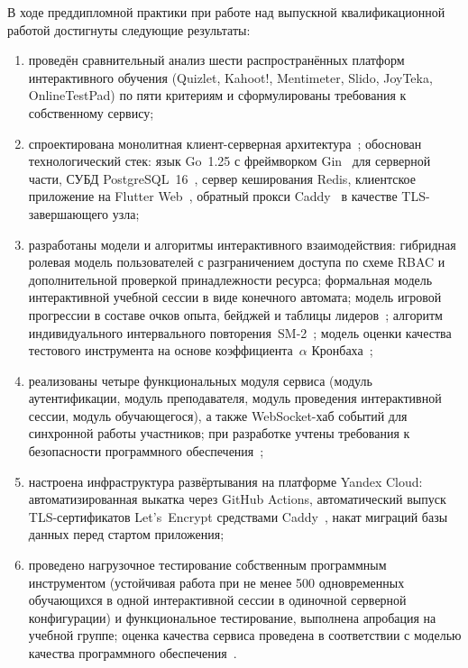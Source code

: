 \documentclass[14pt, a4paper]{extarticle}
\begin{document}
В ходе преддипломной практики при работе над выпускной квалификационной работой достигнуты следующие результаты:
\begin{enumerate}
    \item проведён сравнительный анализ шести распространённых платформ интерактивного обучения (Quizlet, Kahoot!, Mentimeter, Slido, JoyTeka, OnlineTestPad) по пяти критериям и сформулированы требования к собственному сервису;
    \item спроектирована монолитная клиент-серверная архитектура~\cite{kleppmann2017}; обоснован технологический стек: язык Go~1.25 с фреймворком Gin~\cite{gin_docs} для серверной части, СУБД PostgreSQL~16~\cite{postgresql_docs}, сервер кеширования Redis, клиентское приложение на Flutter Web~\cite{flutter_docs}, обратный прокси Caddy~\cite{caddy_docs} в качестве TLS-завершающего узла;
    \item разработаны модели и алгоритмы интерактивного взаимодействия: гибридная ролевая модель пользователей с разграничением доступа по схеме RBAC и дополнительной проверкой принадлежности ресурса; формальная модель интерактивной учебной сессии в виде конечного автомата; модель игровой прогрессии в составе очков опыта, бейджей и таблицы лидеров~\cite{sailer2020,koivisto2019}; алгоритм индивидуального интервального повторения~SM-2~\cite{wozniak1990}; модель оценки качества тестового инструмента на основе коэффициента~$\alpha$ Кронбаха~\cite{cronbach1951,crocker_algina};
    \item реализованы четыре функциональных модуля сервиса (модуль аутентификации, модуль преподавателя, модуль проведения интерактивной сессии, модуль обучающегося), а также WebSocket-хаб событий для синхронной работы участников; при разработке учтены требования к безопасности программного обеспечения~\cite{gost56939};
    \item настроена инфраструктура развёртывания на платформе Yandex Cloud: автоматизированная выкатка через GitHub Actions, автоматический выпуск TLS-сертификатов Let's~Encrypt средствами Caddy~\cite{caddy_docs}, накат миграций базы данных перед стартом приложения;
    \item проведено нагрузочное тестирование собственным программным инструментом (устойчивая работа при не менее 500 одновременных обучающихся в одной интерактивной сессии в одиночной серверной конфигурации) и функциональное тестирование, выполнена апробация на учебной группе; оценка качества сервиса проведена в соответствии с моделью качества программного обеспечения~\cite{gost25010}.
\end{enumerate}
\end{document}
